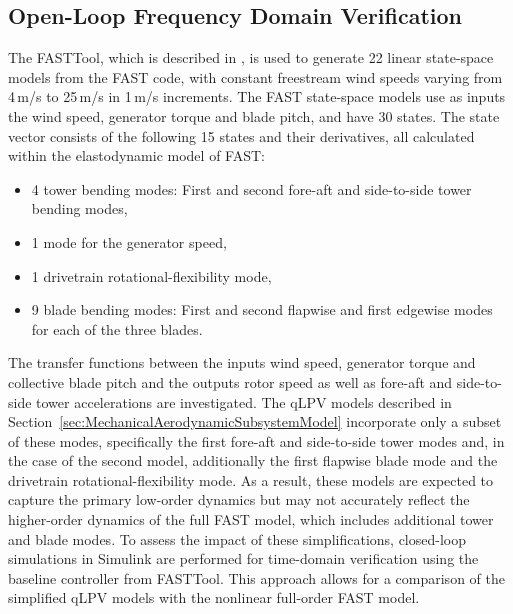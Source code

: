     \subsection{Open-Loop Frequency Domain Verification}
    The FASTTool, which is described in \cite{mulders2020wind}, is used to generate 22 linear state-space models from the FAST code, with constant freestream wind speeds varying from 4\,m/s to 25\,m/s in 1\,m/s increments. The FAST state-space models use as inputs the wind speed, generator torque and blade pitch, and have 30 states. %
    The state vector consists of the following 15 states and their derivatives, all calculated within the elastodynamic model of FAST:
    \begin{itemize}
        \item 4 tower bending modes: First and second fore-aft and side-to-side tower bending modes,
        \item 1 mode for the generator speed,
        \item 1 drivetrain rotational-flexibility mode,
        \item 9 blade bending modes: First and second flapwise and first edgewise modes for each of the three blades.
    \end{itemize}
    The transfer functions between the inputs wind speed, generator torque and collective blade pitch and the outputs rotor speed as well as fore-aft and side-to-side tower accelerations are investigated. The qLPV models described in Section~\ref{sec:MechanicalAerodynamicSubsystemModel} incorporate only a subset of these modes, specifically the first fore-aft and side-to-side tower modes and, in the case of the second model, additionally the first flapwise blade mode and the drivetrain rotational-flexibility mode. As a result, these models are expected to capture the primary low-order dynamics but may not accurately reflect the higher-order dynamics of the full FAST model, which includes additional tower and blade modes. To assess the impact of these simplifications, closed-loop simulations in Simulink are performed for time-domain verification using the baseline controller from FASTTool. This approach allows for a comparison of the simplified qLPV models with the nonlinear full-order FAST model.
